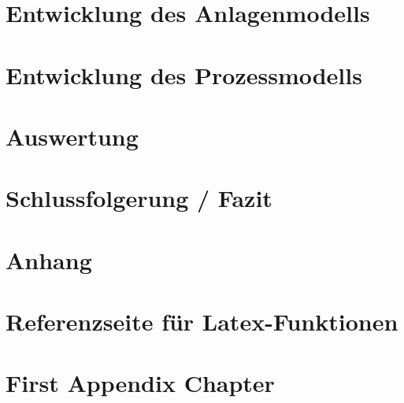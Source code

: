 \documentclass[
  a4paper,
  BCOR=15mm,            %
  twoside,
  bibliography=totoc,   %
  listof=totoc,         %
  monolingual,
  invert-title,
]{bfhthesis}
\begin{document}
\chapter{Entwicklung des Anlagenmodells} \label{Entwicklung des Anlagenmodells}




\chapter{Entwicklung des Prozessmodells} \label{Entwicklung des Prozessmodells}




\chapter{Auswertung} \label{Auswertung}




\chapter{Schlussfolgerung / Fazit} \label{Fazit}

\chapter{Anhang} \label{Anhang}

\chapter{Referenzseite für Latex-Funktionen} 


\declarationOfAuthorship

\clearpage


\listoffigures
 
\listoftables
 
\lstlistoflistings 
 
\printglossary

\clearpage
\printindex
\appendix
\chapter{First Appendix Chapter}
\end{document}
